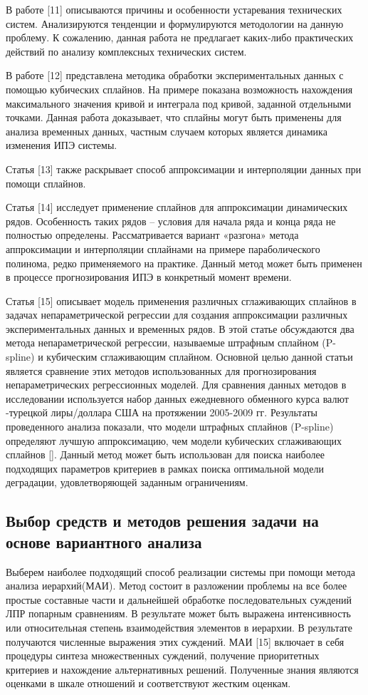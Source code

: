 В работе [11] описываются причины и особенности устаревания технических систем. 
Анализируются тенденции и формулируются методологии на данную проблему. 
К сожалению, данная работа не предлагает каких-либо практических действий по анализу комплексных технических систем.

В работе [12] представлена методика обработки экспериментальных данных с помощью кубических сплайнов. 
На примере показана возможность нахождения максимального значения кривой и интеграла под кривой, заданной отдельными точками. 
Данная работа доказывает, что сплайны могут быть применены для анализа временных данных, частным случаем которых является динамика изменения ИПЭ системы.

Статья [13] также раскрывает способ аппроксимации и интерполяции данных при помощи сплайнов. 

Статья [14] исследует применение сплайнов для аппроксимации динамических рядов. 
Особенность таких рядов – условия для начала ряда и конца ряда не полностью определены. 
Рассматривается вариант «разгона» метода аппроксимации и интерполяции сплайнами на примере параболического полинома, редко применяемого на практике.
Данный метод может быть применен в процессе прогнозирования ИПЭ в конкретный момент времени.

Статья [15] описывает модель применения различных сглаживающих сплайнов в задачах непараметрической регрессии для создания аппроксимации различных экспериментальных данных и временных рядов. 
В этой статье обсуждаются два метода непараметрической регрессии, называемые штрафным сплайном (P-spline) и кубическим сглаживающим сплайном. 
Основной целью данной статьи является сравнение этих методов использованных для прогнозирования непараметрических регрессионных моделей. 
Для сравнения данных методов в исследовании используется набор данных ежедневного обменного курса валют -турецкой лиры/доллара США на протяжении 2005-2009 гг. 
Результаты проведенного анализа показали, что модели штрафных сплайнов (P-spline) определяют лучшую аппроксимацию, чем модели кубических сглаживающих сплайнов []. 
Данный метод может быть использован для поиска наиболее подходящих параметров критериев в рамках поиска оптимальной модели деградации, удовлетворяющей заданным ограничениям.

\subsection{Выбор средств и методов решения задачи на основе вариантного анализа}
Выберем наиболее подходящий способ реализации системы при помощи метода анализа иерархий(МАИ). 
Метод состоит в разложении проблемы на все более простые составные части и дальнейшей обработке последовательных суждений ЛПР попарным сравнениям. 
В результате может быть выражена интенсивность или относительная степень взаимодействия элементов в иерархии. 
В результате получаются численные выражения этих суждений. 
МАИ [15] включает в себя процедуры синтеза множественных суждений, получение приоритетных критериев и нахождение альтернативных решений. 
Полученные знания являются оценками в шкале отношений и соответствуют жестким оценкам. 

